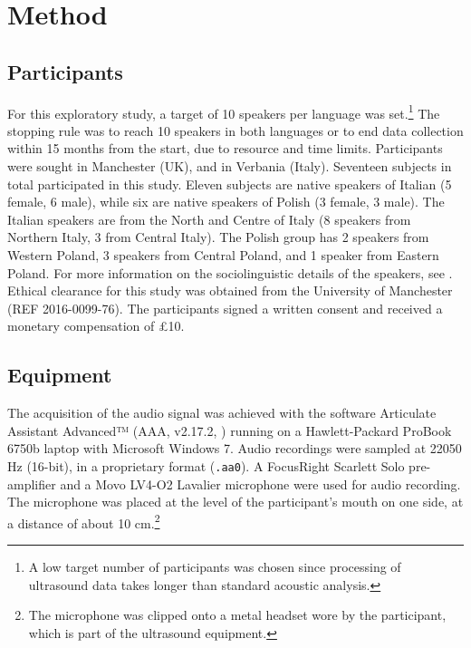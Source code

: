 \documentclass[12pt,]{article}
\let\rmarkdownfootnote\footnote%
\def\footnote{\protect\rmarkdownfootnote}
\begin{document}
\hypertarget{method}{%
\section{Method}\label{method}}

\label{s:method}

\hypertarget{participants}{%
\subsection{Participants}\label{participants}}

For this exploratory study, a target of 10 speakers per language was
set.\footnote{A low target number of participants was chosen since processing of ultrasound data takes longer than standard acoustic analysis.
} The stopping rule was to reach 10 speakers in both languages or to end
data collection within 15 months from the start, due to resource and
time limits. Participants were sought in Manchester (UK), and in
Verbania (Italy). Seventeen subjects in total participated in this
study. Eleven subjects are native speakers of Italian (5 female, 6
male), while six are native speakers of Polish (3 female, 3 male). The
Italian speakers are from the North and Centre of Italy (8 speakers from
Northern Italy, 3 from Central Italy). The Polish group has 2 speakers
from Western Poland, 3 speakers from Central Poland, and 1 speaker from
Eastern Poland. For more information on the sociolinguistic details of
the speakers, see . Ethical clearance for this study
was obtained from the University of Manchester (REF 2016-0099-76). The
participants signed a written consent and received a monetary
compensation of £10.

\hypertarget{equipment}{%
\subsection{Equipment}\label{equipment}}

The acquisition of the audio signal was achieved with the software
Articulate Assistant Advanced™ (AAA, v2.17.2, \citealt{articulate2011})
running on a Hawlett-Packard ProBook 6750b laptop with Microsoft Windows
7. Audio recordings were sampled at 22050 Hz (16-bit), in a proprietary
format (\texttt{.aa0}). A FocusRight Scarlett Solo pre-amplifier and a
Movo LV4-O2 Lavalier microphone were used for audio recording. The
microphone was placed at the level of the participant's mouth on one
side, at a distance of about 10
cm.\footnote{The microphone was clipped onto a metal headset wore by the participant, which is part of the ultrasound equipment.}
\end{document}
